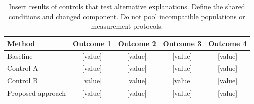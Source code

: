 \begin{table}[!ht]\centering\small
\caption{\suggest Insert results of controls that test alternative explanations. Define the shared conditions and changed component. Do not pool incompatible populations or measurement protocols.}
\label{tab:controls}
\setlength{\tabcolsep}{6pt}
\begin{tabular}{lcccc}\toprule
Method & Outcome 1 & Outcome 2 & Outcome 3 & Outcome 4\\\midrule
Baseline & [value] & [value] & [value] & [value]\\
Control A & [value] & [value] & [value] & [value]\\
Control B & [value] & [value] & [value] & [value]\\
Proposed approach & [value] & [value] & [value] & [value]\\
\bottomrule\end{tabular}
\end{table}
